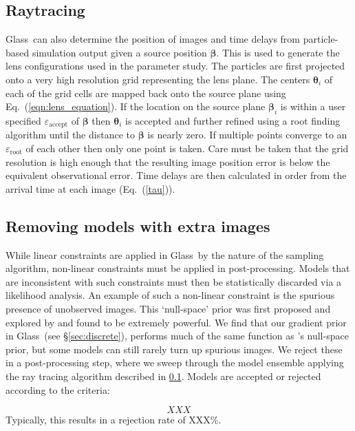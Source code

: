\documentclass[galley,usenatbib]{mn2e}
\newcommand{\Glass}{{\sc Glass}}
\newcommand{\eps}{\ensuremath{\varepsilon}}
\newcommand{\eqnref}[1] {Eq.~(\ref{#1})}
\renewcommand{\vec}[1]{\ensuremath{\boldsymbol{#1}}}
\begin{document}
\subsection{Raytracing}\label{Raytracing}
\Glass\ can also determine the position of images and time delays from 
particle-based simulation output given a source position $\vec\beta$. This is
used to generate the lens configurations used in the parameter study.  The
particles are first projected onto a very high resolution grid representing the
lens plane. The centers $\vec\theta_i$ of each of the grid cells are mapped
back onto the source plane using \eqnref{eqn:lens_equation}. If the location on
the source plane $\vec\beta_i$ is within a user specified
$\eps_\mathrm{accept}$ of $\vec\beta$ then $\vec\theta_i$ is 
accepted and further refined using a root finding algorithm until the distance
to $\vec\beta$ is nearly zero. If multiple points converge to an
$\eps_\mathrm{root}$ of each other then only one point is taken.  Care must be
taken that the grid resolution is high enough that the resulting image position
error is below the equivalent observational error. Time delays are then
calculated in order from the arrival time at each image (\eqnref{tau}).

\subsection{Removing models with extra images}\label{sec:glassextraimages} 
While linear constraints are applied in \Glass\ by the nature of the sampling
algorithm, non-linear constraints must be applied in post-processing. Models
that are inconsistent with such constraints must then be statistically
discarded via a likelihood analysis. An example of such a non-linear constraint
is the spurious presence of unobserved images. This `null-space' prior was
first proposed and explored by \citet{2006MNRAS.367.1209L} and found to be
extremely powerful. We find that our gradient prior in \Glass\ (see
\S\ref{sec:discrete}), performs much of the same function as
\citeauthor{2006MNRAS.367.1209L}'s null-space prior, but some models can still
rarely turn up spurious images. We reject these in a post-processing step,
where we sweep through the model ensemble applying the ray tracing algorithm
described in \ref{Raytracing}. Models are accepted or rejected according to the
criteria: 

\begin{equation}
XXX
\end{equation} 
Typically, this results in a rejection rate of XXX\%. 
\end{document}
